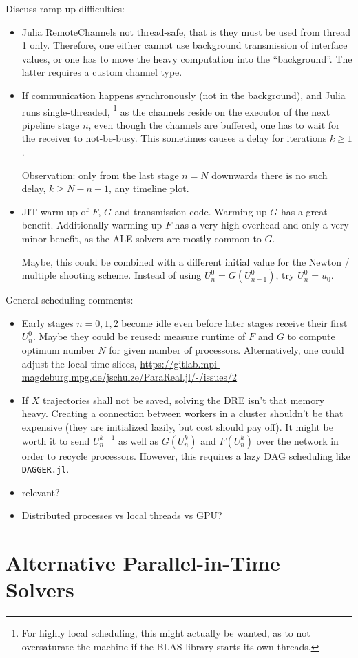 Discuss ramp-up difficulties:
\begin{itemize}
  \item
    Julia RemoteChannels not thread-safe, that is they must be used from thread 1 only.
    Therefore, one either cannot use background transmission of interface values,
    or one has to move the heavy computation into the \enquote{background}.
    The latter requires a custom channel type.

  \item
    If communication happens synchronously (not in the background),
    and Julia runs single-threaded,%
    \footnote{%
      For highly local scheduling, this might actually be wanted,
      as to not oversaturate the machine if the BLAS library starts its own threads.
    }
    as the channels reside on the executor of the next pipeline stage $n$,
    even though the channels are buffered,
    one has to wait for the receiver to not-be-busy.
    This sometimes causes a delay for iterations $k \geq 1$.

    Observation: only from the last stage $n=N$ downwards there is no such delay, $k \geq N-n+1$, \cf any timeline plot.
  \item
    JIT warm-up of $F$, $G$ and transmission code.
    Warming up $G$ has a great benefit.
    Additionally warming up $F$ has a very high overhead and only a very minor benefit,
    as \eg the \ac{ALE} solvers are mostly common to $G$.


    Maybe, this could be combined with a different initial value for the Newton / multiple shooting scheme.
    Instead of using $U^0_n = G(U^0_{n-1})$, try $U^0_n = u_0$.
\end{itemize}

General scheduling comments:
\begin{itemize}
  \item
    Early stages $n=0,1,2$ become idle even before later stages receive their first $U^0_n$.
    Maybe they could be reused: measure runtime of $F$ and $G$ to compute optimum number $N$ for given number of processors.
    Alternatively, one could adjust the local time slices, \cf \url{https://gitlab.mpi-magdeburg.mpg.de/jschulze/ParaReal.jl/-/issues/2}
  \item
    If $X$ trajectories shall not be saved, solving the \ac{DRE} isn't that memory heavy.
    Creating a connection between workers in a cluster shouldn't be that expensive (they are initialized lazily, but cost should pay off).
    It might be worth it to send $U^{k+1}_n$ as well as $G(U^k_n)$ and $F(U^k_n)$ over the network in order to recycle processors.
    However, this requires a lazy DAG scheduling like \texttt{DAGGER.jl}.
  \item
    \cite[493]{Nielsen2018} relevant?
  \item
    Distributed processes vs local threads vs GPU?
\end{itemize}

\section{Alternative Parallel-in-Time Solvers}
\label{sec:pr:alternatives}
